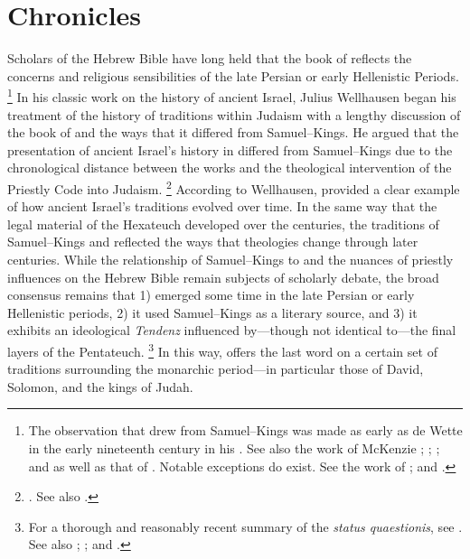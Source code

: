 
\chapter{Chronicles}
\label{chap:chronicles}

Scholars of the Hebrew Bible have long held that the book of \chronicles reflects the concerns and religious sensibilities of the late Persian or early Hellenistic Periods.%
    \footnote{The observation that \chronicles drew from Samuel--Kings was made as early as de Wette in the early nineteenth century in his \cite*{dewette1806}. See also the work of McKenzie
        \cite*{mckenzie1985};
        \cite{mckenzie_graham-mckenzie1999};
        \cite[66--71]{knoppers2003}; and
        \cite[30--42]{klein2006} as well as that of
        \cite[74--74]{carr2011}. Notable exceptions do exist. See the work of
        \cite{auld1994};
        \cite{auld_graham-mckenzie1999} and
        \cite{person2010}.}
In his classic work on the history of ancient Israel, Julius Wellhausen began his treatment of the history of traditions within Judaism with a lengthy discussion of the book of \chronicles and the ways that it differed from Samuel--Kings. He argued that the presentation of ancient Israel's history in \chronicles differed from Samuel--Kings due to the chronological distance between the works and the theological intervention of the Priestly Code into \secondtemple Judaism.%
    \footnote{%
        \cite[171--172]{wellhausen1957}. See also
        \cite{wright_ulrich-wright1992}.}
According to Wellhausen, \chronicles provided a clear example of how ancient Israel's traditions evolved over time. In the same way that the legal material of the Hexateuch developed over the centuries, the traditions of Samuel--Kings and \chronicles reflected the ways that  theologies change through later centuries. While the relationship of Samuel--Kings to \chronicles and the nuances of priestly influences on the Hebrew Bible remain subjects of scholarly debate, the broad consensus remains that 1) \chronicles emerged some time in the late Persian or early Hellenistic periods, 2) it used Samuel--Kings as a literary source, and 3) it exhibits an ideological \emph{Tendenz} influenced by---though not identical to---the final layers of the Pentateuch.%
    \footnote{For a thorough and reasonably recent summary of the \emph{status quaestionis}, see
        \cite[72--89]{knoppers2003}. See also
        \cite{japhet1993};
        \cite{japhet2009};
        \cite{braun1986} and
        \cite{coggins1976}.}
In this way, \chronicles offers the last word on a certain set of traditions surrounding the monarchic period---in particular those of David, Solomon, and the kings of Judah.

